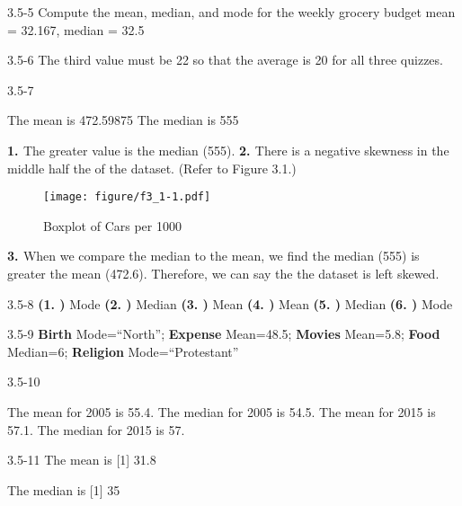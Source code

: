 \begin{exsol@solution}{3.5-5}
	Compute the mean, median, and mode for the weekly grocery budget
	mean = 32.167, median = 32.5

\end{exsol@solution}
\begin{exsol@solution}{3.5-6}
	The third value must be 22 so that the average is 20 for all three quizzes.

\end{exsol@solution}
\begin{exsol@solution}{3.5-7}



    The mean is 472.59875
    The median is 555

{\bf{1. }} The greater value is the median (555).  {\bf{2. }} There is a negative skewness in the middle half the of the dataset.  (Refer to Figure 3.1.)

\begin{figure}[htbp] %
   \centering
   \texttt{[image: figure/f3\_1-1.pdf]}
   \caption{Boxplot of Cars per 1000}
   \label{fig:f3_1}
\end{figure}

{\bf{3. }} When we compare the median to the mean, we find the median (555) is greater the mean (472.6).  Therefore, we can say the the dataset is left skewed.

\end{exsol@solution}
\begin{exsol@solution}{3.5-8}
  {\bf{(1. )}} Mode  {\bf{(2. )}} Median  {\bf{(3. )}} Mean  {\bf{(4. )}} Mean  {\bf{(5. )}} Median  {\bf{(6. )}} Mode

\end{exsol@solution}
\begin{exsol@solution}{3.5-9}
     {\bf{Birth}} Mode=``North'';   {\bf{Expense}} Mean=48.5; {\bf{Movies}} Mean=5.8; {\bf{Food}} Median=6;  {\bf{Religion}} Mode=``Protestant''

\end{exsol@solution}
\begin{exsol@solution}{3.5-10}

The mean for 2005 is 55.4.
The median for 2005 is 54.5.
The mean for 2015 is 57.1.
The median for 2015 is 57.

\end{exsol@solution}
\begin{exsol@solution}{3.5-11}
	The mean is
[1] 31.8


	The median is
[1] 35


\end{exsol@solution}
